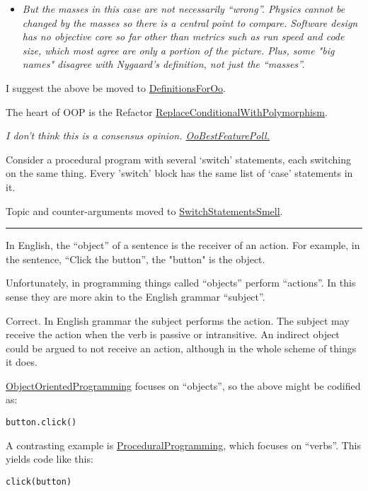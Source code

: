 \documentclass[10pt,twoside,openright]{memoir}
\begin{document}
\begin{itemize}
\begin{itemize}
\item \emph{But the masses in this case are not necessarily ``wrong''. Physics cannot be changed by the masses so there is a central point to compare. Software design has no objective core so far other than metrics such as run speed and code size, which most agree are only a portion of the picture. Plus, some "big names" disagree with Nygaard's definition, not just the ``masses''.}
\end{itemize}
\end{itemize}
I suggest the above be moved to \ul{DefinitionsForOo}.

The heart of OOP is the Refactor \ul{ReplaceConditionalWithPolymorphism}.

\emph{I don't think this is a consensus opinion. \ul{OoBestFeaturePoll.}}

Consider a procedural program with several `switch' statements, each switching on the same thing. Every 'switch' block has the same list of `case' statements in it.

Topic and counter-arguments moved to \ul{SwitchStatementsSmell}.

\vskip 0.1in

\hrule

\vskip 0.1in

In English, the ``object'' of a sentence is the receiver of an action. For example, in the sentence, ``Click the button'', the "button" is the object.

Unfortunately, in programming things called ``objects'' perform ``actions''. In this sense they are more akin to the English grammar ``subject''.

Correct. In English grammar the subject performs the action. The subject may receive the action when the verb is passive or intransitive. An indirect object could be argued to not receive an action, although in the whole scheme of things it does.

\ul{ObjectOrientedProgramming} focuses on ``objects'', so the above might be codified as:

\begin{verbatim}
button.click()
\end{verbatim}

A contrasting example is \ul{ProceduralProgramming}, which focuses on ``verbs''. This yields code like this:

\begin{verbatim}
click(button)
\end{verbatim}
\end{document}
